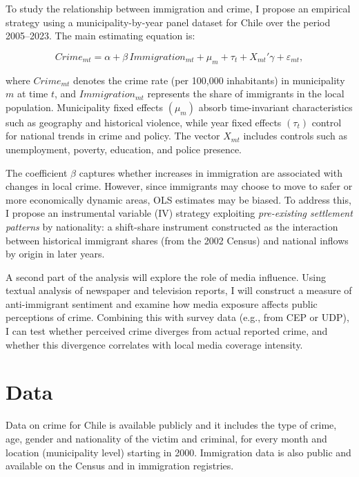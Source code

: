 To study the relationship between immigration and crime, I propose an empirical strategy using a municipality-by-year panel dataset for Chile over the period 2005--2023. The main estimating equation is:

\begin{equation}
	Crime_{mt} = \alpha + \beta \, Immigration_{mt} + \mu_m + \tau_t + X_{mt}'\gamma + \varepsilon_{mt},
\end{equation}

\noindent where $Crime_{mt}$ denotes the crime rate (per 100,000 inhabitants) in municipality $m$ at time $t$, and $Immigration_{mt}$ represents the share of immigrants in the local population. Municipality fixed effects $(\mu_m)$ absorb time-invariant characteristics such as geography and historical violence, while year fixed effects $(\tau_t)$ control for national trends in crime and policy. The vector $X_{mt}$ includes controls such as unemployment, poverty, education, and police presence.

The coefficient $\beta$ captures whether increases in immigration are associated with changes in local crime. However, since immigrants may choose to move to safer or more economically dynamic areas, OLS estimates may be biased. To address this, I propose an instrumental variable (IV) strategy exploiting \emph{pre-existing settlement patterns} by nationality: a shift-share instrument constructed as the interaction between historical immigrant shares (from the 2002 Census) and national inflows by origin in later years.

A second part of the analysis will explore the role of media influence. Using textual analysis of newspaper and television reports, I will construct a measure of anti-immigrant sentiment and examine how media exposure affects public perceptions of crime. Combining this with survey data (e.g., from CEP or UDP), I can test whether perceived crime diverges from actual reported crime, and whether this divergence correlates with local media coverage intensity.


\section{ Data}

Data on crime for Chile is available publicly and it includes the type of crime, age, gender and nationality of the victim and criminal, for every month and location (municipality level) starting in 2000. Immigration data is also public and available 
on the Census and in immigration registries.





